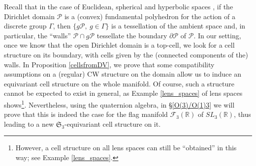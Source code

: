 \documentclass[11pt,twoside]{amsart}
\theoremstyle{plain}
\newcommand{\R}{{\mathbb R}}
\newcommand{\Sym}{\mathfrak{S}}
\begin{document}
Recall that in the case of Euclidean, spherical and hyperbolic spaces \cite[Theorem 6.8.1]{ratcliffe_hyperbolic}, if the Dirichlet domain $\mathcal{P}$ is a (convex) fundamental polyhedron for the action of a discrete group $\Gamma$, then $\{g\mathcal{P},~g\in\Gamma\}$ is a tessellation of the ambient space and, in particular, the ``walls'' $\mathcal{P}\cap g\mathcal{P}$ tessellate the boundary $\partial\mathcal{P}$ of $\mathcal{P}$. In our setting, once we know that the open Dirichlet domain is a top-cell, we look for a cell structure on its boundary, with cells given by the (connected components of the) walls. In Proposition \ref{cellsfromDV}, we prove that some compatibility assumptions on a (regular) CW structure on the domain allow us to induce an equivariant cell structure on the whole manifold. Of course, such a structure cannot be expected to exist in general, as Example \ref{lens_spaces} of lens spaces shows\footnote{However, a cell structure on all lens spaces can still be ``obtained'' in this way; see Example \ref{lens_spaces}.}. Nevertheless, using the quaternion algebra, in \S \ref{O(3)/O(1)3} we will prove that this is indeed the case for the flag manifold $\mathcal{F}_3(\R)$ of $SL_3(\R)$, thus leading to a new $\Sym_3$-equivariant cell structure on it.



\end{document}

